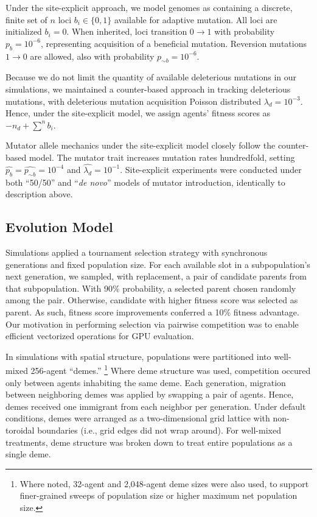 Under the site-explicit approach, we model genomes as containing a discrete, finite set of $n$ loci $b_i \in \{0, 1\}$ available for adaptive mutation.
All loci are initialized $b_i = 0$.
When inherited, loci transition $0 \rightarrow 1$ with probability $p_b = 10^{-6}$, representing acquisition of a beneficial mutation.
Reversion mutations $1 \rightarrow 0$ are allowed, also with probability $p_{\sim b} = 10^{-6}$.

Because we do not limit the quantity of available deleterious mutations in our simulations, we maintained a counter-based approach in tracking deleterious mutations, with deleterious mutation acquisition Poisson distributed $\lambda_d = 10^{-3}$.
Hence, under the site-explicit model, we assign agents' fitness scores as $-n_d + \sum^n b_i$.

Mutator allele mechanics under the site-explicit model closely follow the counter-based model.
The mutator trait increases mutation rates hundredfold, setting $\hat{p_{b}} = \hat{p_{\sim b}} = 10^{-4}$ and $\hat{\lambda_d} = 10^{-1}$.
Site-explicit experiments were conducted under both ``50/50'' and ``\textit{de novo}'' models of mutator introduction, identically to description above.

\subsection{Evolution Model} \label{sec:evolution}

Simulations applied a tournament selection strategy with synchronous generations and fixed population size.
For each available slot in a subpopulation's next generation, we sampled, with replacement, a pair of candidate parents from that subpopulation.
With 90\% probability, a selected parent chosen randomly among the pair.
Otherwise, candidate with higher fitness score was selected as parent.
As such, fitness score improvements conferred a 10\% fitness advantage.
Our motivation in performing selection via pairwise competition was to enable efficient vectorized operations for GPU evaluation.

In simulations with spatial structure, populations were partitioned into well-mixed 256-agent ``demes.''%
\footnote{%
Where noted, 32-agent and 2,048-agent deme sizes were also used, to support finer-grained sweeps of population size or higher maximum net population size.
}
Where deme structure was used, competition occured only between agents inhabiting the same deme.
Each generation, migration between neighboring demes was applied by swapping a pair of agents.
Hence, demes received one immigrant from each neighbor per generation.
Under default conditions, demes were arranged as a two-dimensional grid lattice with non-toroidal boundaries (i.e., grid edges did not wrap around).
For well-mixed treatments, deme structure was broken down to treat entire populations as a single deme.

